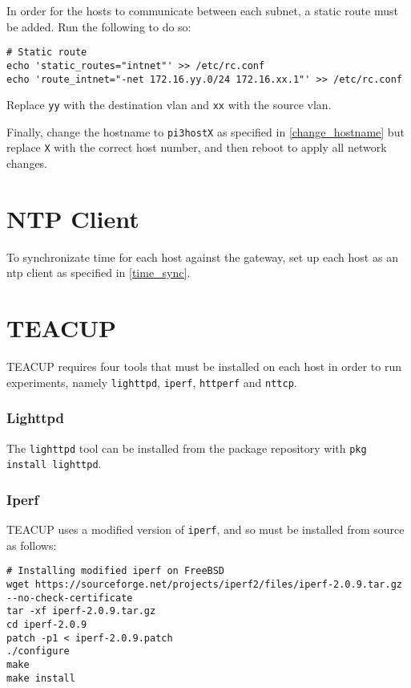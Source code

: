 In order for the hosts to communicate between each subnet, a static route must be added. Run the following to do so:

\begin{lstlisting}
# Static route
echo 'static_routes="intnet"' >> /etc/rc.conf
echo 'route_intnet="-net 172.16.yy.0/24 172.16.xx.1"' >> /etc/rc.conf
\end{lstlisting}

Replace \lstinline{yy} with the destination \gls{vlan} and \lstinline{xx} with the source \gls{vlan}.

Finally, change the hostname to \lstinline{pi3hostX} as specified in \ref{change_hostname} but replace \lstinline{X} with the correct host number, and then reboot to apply all network changes.


\section{NTP Client}

To synchronizate time for each host against the gateway, set up each host as an \gls{ntp} client as specified in \ref{time_sync}.


\section{TEACUP}

TEACUP requires four tools that must be installed on each host in order to run experiments, namely \lstinline{lighttpd},  \lstinline{iperf}, \lstinline{httperf} and \lstinline{nttcp}.

\subsubsection{Lighttpd}

The \lstinline{lighttpd} tool can be installed from the package repository with \lstinline{pkg install lighttpd}.

\subsubsection{Iperf}

TEACUP uses a modified version of \lstinline{iperf}, and so must be installed from source as follows:

\begin{lstlisting}
# Installing modified iperf on FreeBSD
wget https://sourceforge.net/projects/iperf2/files/iperf-2.0.9.tar.gz --no-check-certificate
tar -xf iperf-2.0.9.tar.gz
cd iperf-2.0.9
patch -p1 < iperf-2.0.9.patch
./configure
make
make install
\end{lstlisting}

